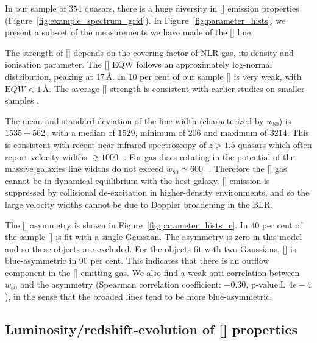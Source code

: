 In our sample of $354$ quasars, there is a huge diversity in [] emission properties (Figure~\ref{fig:example_spectrum_grid}). 
In Figure~\ref{fig:parameter_hists}, we present a sub-set of the measurements we have made of the [] line.  

The strength of [] depends on the covering factor of NLR gas, its density and ionisation parameter. 
The [] EQW follows an approximately log-normal distribution, peaking at $17$\,\AA. 
In $10$ per cent of our sample [] is very weak, with ${\mathrm EQW} < 1$\,\AA.  
The average [] strength is consistent with earlier studies on smaller samples \citep[e.g.][]{sulentic04,netzer04,shen16a}.

The mean and standard deviation of the line width (characterized by $w_{80}$) is $1535\pm562$\,\kms, with a median of $1529$, minimum of $206$ and maximum of $3214$. 
This is consistent with recent near-infrared spectroscopy of $z>1.5$ quasars which often report velocity widths $\gtrsim1000$\,\kms\, \citep[e.g.][]{netzer04,kim13,brusa15,shen16a}. 
For gas discs rotating in the potential of the massive galaxies line widths do not exceed $w_{80}\simeq600$\,\kms\, \citep{liu13}. 
Therefore the [] gas cannot be in dynamical equilibrium with the host-galaxy. 
[] emission is suppressed by collisional de-excitation in higher-density environments, and so the large velocity widths cannot be due to Doppler broadening in the BLR. 

The [] asymmetry is shown in Figure~\ref{fig:parameter_hists_c}. 
In $40$ per cent of the sample [] is fit with a single Gaussian. 
The asymmetry is zero in this model and so these objects are excluded. 
For the objects fit with two Gaussians, [] is blue-asymmetric in 90 per cent. 
This indicates that there is an outflow component in the []-emitting gas. 
We also find a weak anti-correlation between $w_{80}$ and the asymmetry (Spearman correlation coefficient: $-0.30$, p-value:L $4e-4$), in the sense that the broaded lines tend to be more blue-asymmetric.  

\subsection{Luminosity/redshift-evolution of [] properties}


